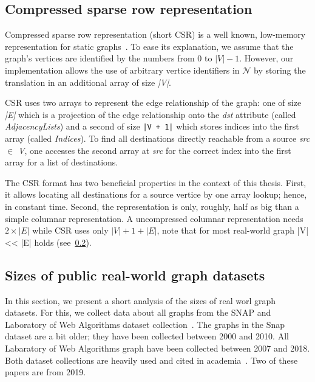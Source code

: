 \subsection{Compressed sparse row representation}\label{subsec:csr-background}
Compressed sparse row representation (short CSR) is a well known, low-memory representation for static graphs~\cite{csr,csr-first}.
To ease its explanation, we assume that the graph's vertices are identified by the numbers from 0 to $|V| - 1$.
However, our implementation allows the use of arbitrary vertice identifiers in $\mathcal{N}$ by storing the translation in an additional
array of size \textit{|V|}.

CSR uses two arrays to represent the edge relationship of the graph: one of size \textit{|E|} which is a projection of the edge relationship
onto the \textit{dst} attribute (called \textit{AdjacencyLists}) and a second of size \texttt{|V + 1|} which stores indices into the first
array (called \textit{Indices}).
To find all destinations directly reachable from a source \textit{src $\in$ V}, one accesses the second array at \textit{src} for the
correct index into the first array for a list of destinations.

The CSR format has two beneficial properties in the context of this thesis.
First, it allows locating all destinations for a source vertice by one array lookup;
hence, in constant time.
Second, the representation is only, roughly, half as big than a simple columnar representation.
A uncompressed columnar representation needs $2 \times |E|$ while CSR uses only $|V| + 1 + |E|$, note that for most real-world graph |V|
<< |E| holds (see~\cref{subsec:graph-analysis}).

\subsection{Sizes of public real-world graph datasets} \label{subsec:graph-analysis}
In this section, we present a short analysis of the sizes of real worl graph datasets.
For this, we collect data about all graphs from the SNAP and Laboratory of Web Algorithms dataset collection~\cite{snapnets,
law}.
The graphs in the Snap dataset are a bit older;
they have been collected between 2000 and 2010.
All Labaratory of Web Algorithms graph have been collected between 2007 and 2018.
Both dataset collections are heavily used and cited in academia~\cite{ammar2018distributed,olddog,myria-detailed,fractal,longbin}.
Two of these papers are from 2019.

